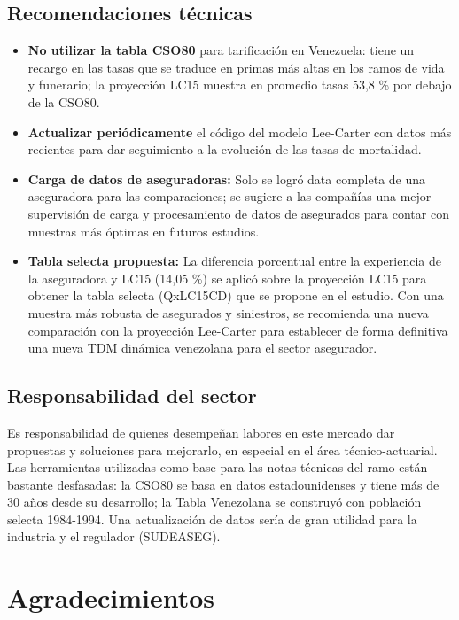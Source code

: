 \documentclass[
  11pt,
  a4paper,
]{article}
\begin{document}
\subsection{Recomendaciones técnicas}\label{recomendaciones-tuxe9cnicas}

\begin{itemize}
\item
  \textbf{No utilizar la tabla CSO80} para tarificación en Venezuela:
  tiene un recargo en las tasas que se traduce en primas más altas en
  los ramos de vida y funerario; la proyección LC15 muestra en promedio
  tasas 53,8 \% por debajo de la CSO80.
\item
  \textbf{Actualizar periódicamente} el código del modelo Lee-Carter con
  datos más recientes para dar seguimiento a la evolución de las tasas
  de mortalidad.
\item
  \textbf{Carga de datos de aseguradoras:} Solo se logró data completa
  de una aseguradora para las comparaciones; se sugiere a las compañías
  una mejor supervisión de carga y procesamiento de datos de asegurados
  para contar con muestras más óptimas en futuros estudios.
\item
  \textbf{Tabla selecta propuesta:} La diferencia porcentual entre la
  experiencia de la aseguradora y LC15 (14,05 \%) se aplicó sobre la
  proyección LC15 para obtener la tabla selecta (QxLC15CD) que se
  propone en el estudio. Con una muestra más robusta de asegurados y
  siniestros, se recomienda una nueva comparación con la proyección
  Lee-Carter para establecer de forma definitiva una nueva TDM dinámica
  venezolana para el sector asegurador.
\end{itemize}

\subsection{Responsabilidad del
sector}\label{responsabilidad-del-sector}

Es responsabilidad de quienes desempeñan labores en este mercado dar
propuestas y soluciones para mejorarlo, en especial en el área
técnico-actuarial. Las herramientas utilizadas como base para las notas
técnicas del ramo están bastante desfasadas: la CSO80 se basa en datos
estadounidenses y tiene más de 30 años desde su desarrollo; la Tabla
Venezolana se construyó con población selecta 1984-1994. Una
actualización de datos sería de gran utilidad para la industria y el
regulador (SUDEASEG).

\section*{Agradecimientos}\label{agradecimientos}
\end{document}
